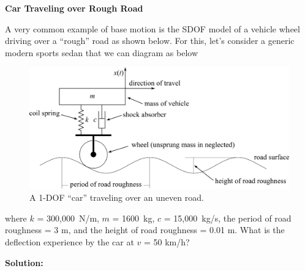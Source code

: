 \documentclass[12pt,letter]{article}
\begin{document}
		\begin{example}
			\textbf{Car Traveling over Rough Road}

			\noindent A very common example of base motion is the SDOF model of a vehicle wheel driving over a ``rough'' road as shown below. For this, let's consider a generic modern sports sedan that we can diagram as below
			\begin{figure}[H]
				\centering
				\includegraphics[]{../figures/vehicle_on_road_example.png}
				\caption{A 1-DOF ``car'' traveling over an uneven road.}
			\end{figure}				
			\noindent where $k$ = 300,000~N/m, $m$ = 1600~kg, $c$ = 15,000~kg/s, the period of road roughness = 3 m, and the height of road roughness = 0.01 m. What is the deflection experience by the car at $v$ = 50 km/h?
			
			\noindent\textbf{Solution:}


\end{example}
\end{document}

